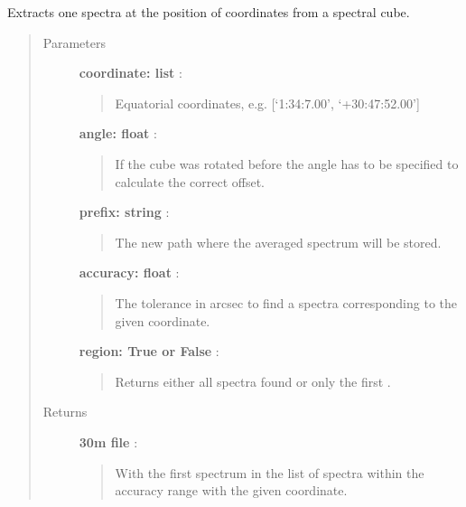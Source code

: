 \documentclass[a4paper,10pt,english]{sphinxmanual}
\begin{document}
\begin{fulllineitems}
\begin{fulllineitems}
\end{fulllineitems}


\begin{fulllineitems}
\label{spectra:astrolyze.spectra.class_.ClassSpectra.get_spectra_from_cube}
Extracts one spectra at the position of coordinates from a
spectral cube.
\begin{quote}\begin{description}
\item[{Parameters }] \leavevmode
\textbf{coordinate: list} :
\begin{quote}

Equatorial coordinates, e.g. {[}`1:34:7.00', `+30:47:52.00'{]}
\end{quote}

\textbf{angle: float} :
\begin{quote}

If the cube was rotated before the angle has to be specified
to calculate the correct offset.
\end{quote}

\textbf{prefix: string} :
\begin{quote}

The new path where the averaged spectrum will be stored.
\end{quote}

\textbf{accuracy: float} :
\begin{quote}

The tolerance in arcsec to find a spectra corresponding to the
given coordinate.
\end{quote}

\textbf{region: True or False} :
\begin{quote}

Returns either all spectra found  or only the first
.
\end{quote}

\item[{Returns }] \leavevmode
\textbf{30m file} :
\begin{quote}

With the first spectrum in the list of spectra within the accuracy
range with the given coordinate.
\end{quote}


\end{description}
\end{quote}
\end{fulllineitems}
\end{fulllineitems}
\end{document}
